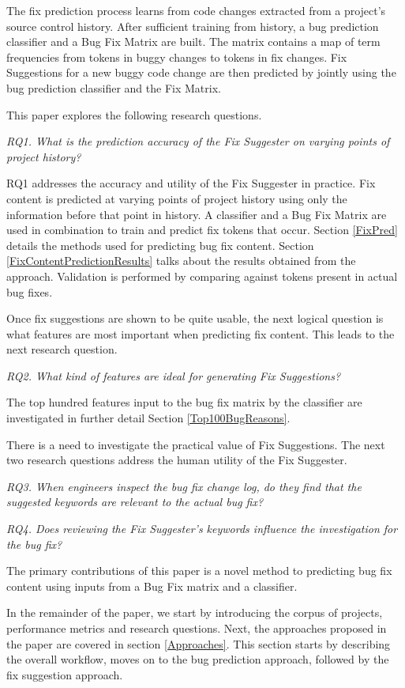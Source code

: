 \documentclass[journal,10pt,draftclsnofoot,twocolumn]{IEEEtran}
\begin{document}
The fix prediction process learns from code changes extracted from a project's source control history. After sufficient
training from history, a bug prediction classifier and a Bug Fix Matrix are built. The matrix contains a map of term frequencies from tokens in buggy changes to tokens in fix changes. Fix Suggestions for a new buggy code change are then predicted by jointly using the bug prediction classifier and the Fix Matrix.

This paper explores the following research questions.

\textit{RQ1. What is the prediction accuracy of the Fix Suggester on varying points of project history?}

RQ1 addresses the accuracy and utility of the Fix Suggester in practice. Fix content is predicted at varying points of project history using
only the information before that point in history. A classifier
and a Bug Fix Matrix are used in combination to train and predict fix tokens that occur. Section
\ref{FixPred} details the methods used for predicting
bug fix content. Section \ref{FixContentPredictionResults} talks
about the results obtained from the approach. Validation is performed by comparing against tokens present in actual bug fixes.

Once fix suggestions are shown to be quite usable, the next logical question is what features are most important when predicting fix content. This leads to the next research question. 

\textit{RQ2. What kind of features are ideal for generating Fix Suggestions?}

The top hundred features input to the bug fix matrix by the classifier are investigated in further detail Section \ref{Top100BugReasons}.

There is a need to investigate the practical value of Fix Suggestions. The next two research questions address the human utility of the Fix Suggester.

\textit{RQ3. When engineers inspect the bug fix change log, do they find that the suggested keywords are relevant to the actual bug fix?}

\textit{RQ4. Does reviewing the Fix Suggester's keywords influence the investigation for the bug fix?}


The primary contributions of this paper is a novel method to predicting bug fix content using inputs from a Bug Fix matrix and a classifier. 

In the remainder of the paper, we start by introducing the corpus of projects, performance metrics and research questions. Next, the approaches proposed in the paper are covered in section \ref{Approaches}. This section starts by describing the overall workflow, moves
on to the bug prediction approach, followed by the fix suggestion approach.
\end{document}
